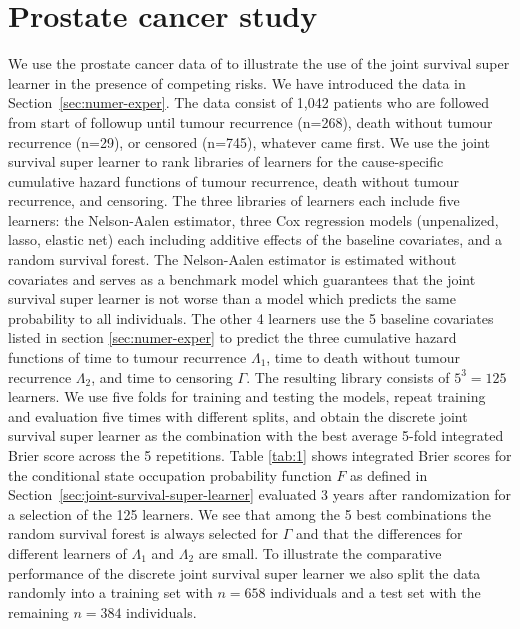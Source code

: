 \documentclass[lineno]{biometrika}
\newcommand{\1}{\mathds{1}}
\begin{document}
\section{Prostate cancer study}
\label{sec:real-data-appl}

We use the prostate cancer data of \cite{kattan2000pretreatment} to
illustrate the use of the joint survival super learner in the presence
of competing risks. We have introduced the data in
Section~\ref{sec:numer-exper}. The data consist of 1,042 patients who
are followed from start of followup until tumour recurrence (n=268),
death without tumour recurrence (n=29), or censored (n=745), whatever
came first. We use the joint survival super learner to rank libraries
of learners for the cause-specific cumulative hazard functions of
tumour recurrence, death without tumour recurrence, and censoring. The
three libraries of learners each include five learners: the
Nelson-Aalen estimator, three Cox regression models (unpenalized,
lasso, elastic net) each including additive effects of the baseline
covariates, and a random survival forest. The Nelson-Aalen estimator
is estimated without covariates and serves as a benchmark model which
guarantees that the joint survival super learner is not worse than a
model which predicts the same probability to all individuals. The
other 4 learners use the 5 baseline covariates listed in section
\ref{sec:numer-exper} to predict the three cumulative hazard functions
of time to tumour recurrence \( \Lambda_1 \), time to death without
tumour recurrence \( \Lambda_2 \), and time to censoring $\Gamma$. The
resulting library consists of \( 5^3 = 125 \) learners. We use five
folds for training and testing the models, repeat training and
evaluation five times with different splits, and obtain the discrete
joint survival super learner as the combination with the best average
5-fold integrated Brier score across the 5 repetitions. Table
\ref{tab:1} shows integrated Brier scores for the conditional state
occupation probability function \( F \) as defined in
Section~\ref{sec:joint-survival-super-learner} evaluated 3 years after
randomization for a selection of the 125 learners. We see that among
the 5 best combinations the random survival forest is always selected
for \(\Gamma\) and that the differences for different learners of
\(\Lambda_1\) and \(\Lambda_2\) are small. To illustrate the
comparative performance of the discrete joint survival super learner
we also split the data randomly into a training set with \(n=658\)
individuals and a test set with the remaining \(n=384\) individuals.
\end{document}
